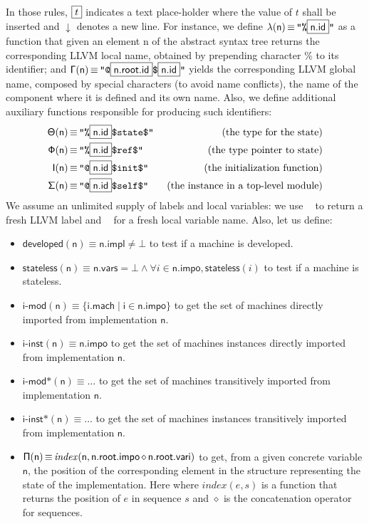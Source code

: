 \documentclass{llncs}
\newcommand{\nl}[0]{\ensuremath{\downarrow}}
\DeclareMathOperator{\conc}{\diamond}
\DeclareMathOperator{\isdef}{\equiv}
\DeclareMathOperator{\lbl}{\mathcal{L}()}
\DeclareMathOperator{\variable}{\mathcal{V}()}
\newcommand{\llvm}[1]{\texttt{#1}}
\newcommand{\B}[1]{\textsf{#1}}
\newcommand{\PH}[1]{\framebox{$#1$}}
\newcommand{\Global}[0]{\ensuremath{\sf\Gamma}}
\newcommand{\local}[0]{\ensuremath{\sf\lambda}}
\newcommand{\developed}[0]{\ensuremath{\textsf{developed}}}
\newcommand{\stateless}[0]{\ensuremath{\textsf{stateless}}}
\newcommand{\importedmodules}[0]{\ensuremath{\textsf{i-mod}}}
\newcommand{\trimportedmodules}[0]{\ensuremath{\textsf{i-mod$\mathsf{\ast}$}}}
\newcommand{\importedinstances}[0]{\ensuremath{\textsf{i-inst}}}
\newcommand{\trimportedinstances}[0]{\ensuremath{\textsf{i-inst$\mathsf{\ast}$}}}
\newcommand{\idx}[0]{\ensuremath{\sf\Pi}}
\newcommand{\state}[0]{\ensuremath{\sf\Theta}}
\newcommand{\stateref}[0]{\ensuremath{\sf\Phi}}
\newcommand{\self}[0]{\ensuremath{\sf\Sigma}}
\newcommand{\init}[0]{\ensuremath{\mathsf{I}}}
\begin{document}
\begin{enumerate}
In those rules, $\PH{t}$ indicates a text place-holder where the value of $t$
shall be inserted and $\nl$ denotes a new line. For instance, we define
$\local(\B{n}) \isdef \llvm{"\%\PH{\B{n.id}}"}$ as a function that given an
element \B{n} of the abstract syntax tree returns the corresponding LLVM local
name, obtained by prepending character \% to its identifier; and $\Global(\B{n})
\isdef \llvm{"@\PH{\B{n.root.id}}\$\PH{\B{n.id}}"}$ yields the corresponding
LLVM global name, composed by special characters (to avoid name conflicts), the
name of the component where it is defined and its own name.  Also, we define
additional auxiliary functions responsible for producing such identifiers:
\begin{align*}
\state(\B{n}) & \isdef \llvm{"\%\PH{\B{n.id}}\$state\$"} & \text{ (the type for the state)} \\
\stateref(\B{n}) & \isdef \llvm{"\%\PH{\B{n.id}}\$ref\$"} & \text{ (the type pointer to state)} \\
\init(\B{n}) & \isdef \llvm{"@\PH{\B{n.id}}\$init\$"} & \text{ (the initialization function)} \\
\self(\B{n}) & \isdef \llvm{"@\PH{\B{n.id}}\$self\$"} & \text{ (the instance in a top-level module)}
\end{align*}
We assume an unlimited supply of labels and local variables: we use $\lbl$ to
return a fresh LLVM label and $\variable$ for a fresh local variable name. Also, let us define:
\begin{itemize}
\item $\developed(\B{n}) \isdef \B{n.impl} \neq \bot$ to test if a machine is
  developed.
\item $\stateless(\B{n}) \isdef \B{n.vars} =  \bot \land \forall i \in \B{n.impo}, \stateless(i)$ to test if a machine is stateless.
\item $\importedmodules(\B{n}) \isdef \{ \B{i.mach} \mid \B{i} \in \B{n.impo}
  \}$ to get the set of machines directly imported from implementation $\B{n}$.
\item $\importedinstances(\B{n}) \isdef \B{n.impo}$ to get the set of machines
  instances directly imported from implementation $\B{n}$.
\item $\trimportedmodules(\B{n}) \isdef \ldots$ to get the set of machines
transitively imported from implementation $\B{n}$.
\item $\trimportedinstances(\B{n}) \isdef \ldots$ to get the set of machines
instances transitively imported from implementation $\B{n}$.
\item $\idx(\B{n}) \isdef \mathit{index}(\B{n}, \B{n.root.impo} \conc
  \B{n.root.vari})$ to get, from a given concrete variable $\B{n}$, the position
  of the corresponding element in the structure representing the state of the
  implementation. Here where $\mathit{index}(e, s)$ is a function that returns
  the position of $e$ in sequence $s$ and $\conc$ is the concatenation operator
  for sequences.
\end{itemize}


\end{enumerate}
\end{document}
